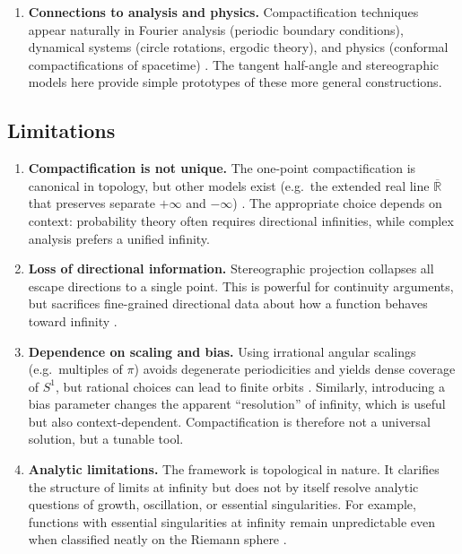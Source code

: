 \documentclass[12pt]{article}
\theoremstyle{remark}
\begin{document}
\begin{enumerate}
    \item \textbf{Connections to analysis and physics.}  
    Compactification techniques appear naturally in Fourier analysis (periodic 
    boundary conditions), dynamical systems (circle rotations, ergodic theory), 
    and physics (conformal compactifications of spacetime) 
    \citep{katok1997introduction,gibbons2006measure,penrose1964conformal}. 
    The tangent half-angle and stereographic models here provide simple 
    prototypes of these more general constructions.
\end{enumerate}

\subsection{Limitations}

\begin{enumerate}
    \item \textbf{Compactification is not unique.}  
    The one-point compactification is canonical in topology, but other models 
    exist (e.g.\ the extended real line $\overline{\mathbb{R}}$ that preserves 
    separate $+\infty$ and $-\infty$) \citep{munkres2000topology}. 
    The appropriate choice depends on context: probability theory often requires 
    directional infinities, while complex analysis prefers a unified infinity.

    \item \textbf{Loss of directional information.}  
    Stereographic projection collapses all escape directions to a single point. 
    This is powerful for continuity arguments, but sacrifices fine-grained 
    directional data about how a function behaves toward infinity 
    \citep{ahlfors1979complex}.

    \item \textbf{Dependence on scaling and bias.}  
    Using irrational angular scalings (e.g.\ multiples of $\pi$) avoids 
    degenerate periodicities and yields dense coverage of $S^1$, but rational 
    choices can lead to finite orbits \citep{weyl1916gleichverteilung,kuipers1974uniform}. 
    Similarly, introducing a bias parameter changes the apparent “resolution” 
    of infinity, which is useful but also context-dependent. Compactification is 
    therefore not a universal solution, but a tunable tool.

    \item \textbf{Analytic limitations.}  
    The framework is topological in nature. It clarifies the structure of limits 
    at infinity but does not by itself resolve analytic questions of growth, 
    oscillation, or essential singularities. For example, functions with 
    essential singularities at infinity remain unpredictable even when classified 
    neatly on the Riemann sphere \citep{ahlfors1979complex}.
\end{enumerate}
\end{document}
